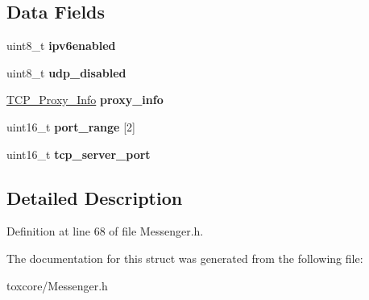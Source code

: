\subsection*{Data Fields}
\begin{DoxyCompactItemize}
\item 
\hypertarget{struct_messenger___options_abf85a84f394474115b9f45f037ad3378}{uint8\+\_\+t {\bfseries ipv6enabled}}\label{struct_messenger___options_abf85a84f394474115b9f45f037ad3378}

\item 
\hypertarget{struct_messenger___options_a1510f9751065ec1a6d485c4b3072b9d7}{uint8\+\_\+t {\bfseries udp\+\_\+disabled}}\label{struct_messenger___options_a1510f9751065ec1a6d485c4b3072b9d7}

\item 
\hypertarget{struct_messenger___options_aa737023350cf47e63993e3b4dc9a7472}{\hyperlink{struct_t_c_p___proxy___info}{T\+C\+P\+\_\+\+Proxy\+\_\+\+Info} {\bfseries proxy\+\_\+info}}\label{struct_messenger___options_aa737023350cf47e63993e3b4dc9a7472}

\item 
\hypertarget{struct_messenger___options_a6a840950904ae4d13e6726cf5f341fc0}{uint16\+\_\+t {\bfseries port\+\_\+range} \mbox{[}2\mbox{]}}\label{struct_messenger___options_a6a840950904ae4d13e6726cf5f341fc0}

\item 
\hypertarget{struct_messenger___options_a9f404f426cc09060b42b9a61523cc573}{uint16\+\_\+t {\bfseries tcp\+\_\+server\+\_\+port}}\label{struct_messenger___options_a9f404f426cc09060b42b9a61523cc573}

\end{DoxyCompactItemize}


\subsection{Detailed Description}


Definition at line 68 of file Messenger.\+h.



The documentation for this struct was generated from the following file\+:\begin{DoxyCompactItemize}
\item 
toxcore/Messenger.\+h\end{DoxyCompactItemize}
